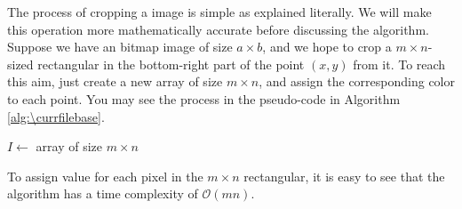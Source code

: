 \documentclass[catalog.tex]{subfiles}
\begin{document}
The process of cropping a image is simple as explained literally. We will make this operation more mathematically accurate before discussing the algorithm. Suppose we have an bitmap image of size $a\times b$, and we hope to crop a $m\times n$-sized rectangular in the bottom-right part of the point $(x,y)$ from it. To reach this aim, just create a new array of size $m\times n$, and assign the corresponding color to each point. You may see the process in the pseudo-code in Algorithm \ref{alg:\currfilebase}.

\begin{Algorithm}[Image Cropping\label{alg:\currfilebase}, t]
    $I\gets$ array of size $m\times n$


\end{Algorithm}

To assign value for each pixel in the $m\times n$ rectangular, it is easy to see that the algorithm has a time complexity of $\mathcal{O}(mn)$.


\singlespacing
\printbibliography[title={References.},resetnumbers=true,heading=subbibliography]
\end{document}
